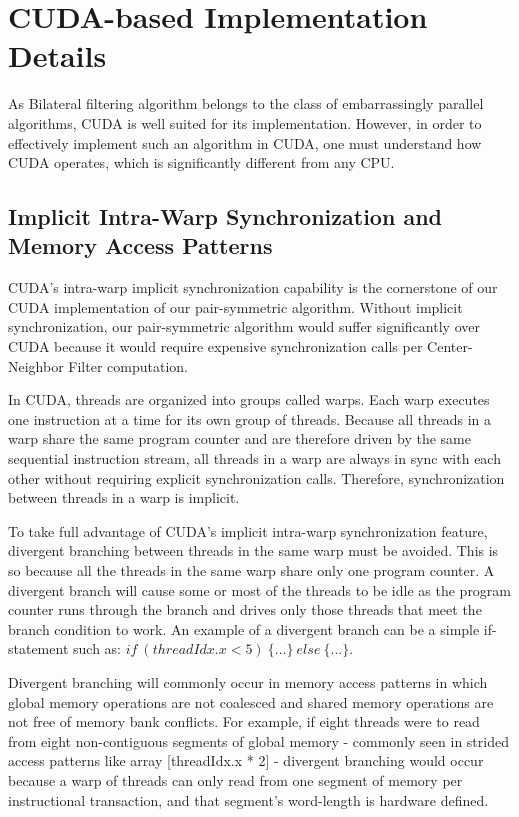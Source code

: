 \documentclass{IEEEtran}
\begin{document}
\section{CUDA-based Implementation Details}
\label{sec:GPUoptimizations} 
As Bilateral filtering algorithm belongs to the class of embarrassingly parallel algorithms, CUDA is well suited for its implementation. However,
in order to effectively implement such an algorithm in CUDA, one must understand how CUDA operates, which is significantly different from any CPU.

\subsection{Implicit Intra-Warp Synchronization and Memory Access Patterns}

CUDA's intra-warp implicit synchronization capability is the cornerstone of our CUDA implementation of our pair-symmetric algorithm. Without implicit synchronization, our pair-symmetric algorithm would suffer significantly over CUDA because it would require expensive synchronization calls per Center-Neighbor Filter computation.

In CUDA, threads are organized into groups called warps. Each warp executes one instruction at a time for its own group of threads. Because all threads in a warp share the same program counter and are therefore driven by the same sequential instruction stream, all threads in a warp are always in sync with each other without requiring explicit synchronization calls. Therefore, synchronization between threads in a warp is implicit.

To take full advantage of CUDA's implicit intra-warp synchronization feature, divergent branching between threads in the same warp must be avoided. This is so because all the threads in the same warp share only one program counter. A divergent branch will cause some or most of the threads to be idle as the program counter runs through the branch and drives only those threads that meet the branch condition to work. An example of a divergent branch can be a simple if-statement such as: $if~(threadIdx.x < 5)~\{...\}~else~\{...\}$.

Divergent branching will commonly occur in memory access patterns in which global memory operations are not coalesced and shared memory operations are not free of memory bank conflicts. For example, if eight threads were to read from eight non-contiguous segments of global memory - commonly seen in strided access patterns like array {[}threadIdx.x {*} 2{]} - divergent branching would occur because a warp of threads can only read from one segment of memory per instructional transaction, and that segment's word-length is hardware defined.
\end{document}
